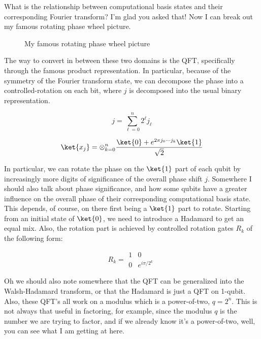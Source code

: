 What is the relationship between computational basis states and their
corresponding Fourier transform? I'm glad you asked that! Now I can break out
my famous rotating phase wheel picture.

\begin{figure}
\caption{My famous rotating phase wheel picture}
\end{figure}

The way to convert in between these two domains is the QFT, specifically
through the famous product representation. In particular, because of the
symmetry of the Fourier transform state, we can decompose the phase into
a controlled-rotation on each bit, where $j$ is decomposed into the
usual binary representation.

\begin{equation}
j = \sum_{\ell=0}^n 2^\ell j_\ell 
\end{equation}

\begin{equation}
\ket{x_j} = \otimes_{k=0}^{n}
\frac{\ket{0} + e^{2\pi j_0 \cdots j_k}\ket{1}}{\sqrt{2}}
\end{equation}

In particular, we can rotate the phase on the $\ket{1}$ part of each qubit by
increasingly more digits of significance of the overall phase shift $j$.
Somewhere I should also talk about phase significance, and how some qubits
have a greater influence on the overall phase of their corresponding
computational basis state. This depends, of course, on there first being
a $\ket{1}$ part to rotate. Starting from an initial state of $\ket{0}$, we
need to introduce a Hadamard to get an equal mix. Also, the rotation part is
achieved by controlled rotation gates $R_k$ of the following form:

\begin{equation}
R_k = \begin{array}{cc}
1 & 0 \\
0 & e^{i\pi / 2^k}
\end{array}
\end{equation}

Oh we should also note somewhere that the QFT can be generalized into the
Walsh-Hadamard transform, or that the Hadamard is just a QFT on 1-qubit.
Also, these QFT's all work on a modulus which is a power-of-two, $q=2^n$. This
is not always that useful in factoring, for example, since the modulus $q$ is
the number we are trying to factor, and if we already know it's a power-of-two,
well, you can see what I am getting at here.

